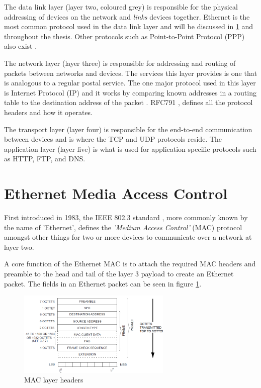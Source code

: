 The data link layer (layer two, coloured grey) is responsible for the physical addressing of devices on the network and \textit{links} devices together. Ethernet is the most common protocol used in the data link layer and will be discussed in \ref{sec:eth_mac_lit} and throughout the thesis. Other protocols such as Point-to-Point Protocol (PPP) also exist \cite{ciscoCCNABook}.

The network layer (layer three) is responsible for addressing and routing of packets between networks and devices. The services this layer provides is one that is analogous to a regular postal service. The one major protocol used in this layer is Internet Protocol (IP) and it works by comparing known addresses in a routing table to the destination address of the packet \cite{ciscoCCNABook}. RFC791 \cite{rfc791}, defines all the protocol headers and how it operates.

The transport layer (layer four) is responsible for the end-to-end communication between devices and is where the TCP and UDP protocols reside. The application layer (layer five) is what is used for application specific protocols such as HTTP, FTP, and DNS.





\section{Ethernet Media Access Control}
\label{sec:eth_mac_lit}

First introduced in 1983, the IEEE 802.3 standard \cite{IEEE802.3-2012}, more commonly known by the name of 'Ethernet', defines the \textit{'Medium Access Control'} (MAC) protocol amongst other things for two or more devices to communicate over a network at layer two. 

A core function of the Ethernet MAC is to attach the required MAC headers and preamble to the head and tail of the layer 3 payload to create an Ethernet packet. The fields in an Ethernet packet can be seen in figure \ref{fig:ieee-mac-headers}. 

\begin{figure}[h]
    \centering
    \includegraphics[width=0.65\textwidth]{Images/mac_packet.png}
    \caption[MAC layer headers]{MAC layer headers \cite{IEEE802.3-2012}}
    \label{fig:ieee-mac-headers}
\end{figure}

